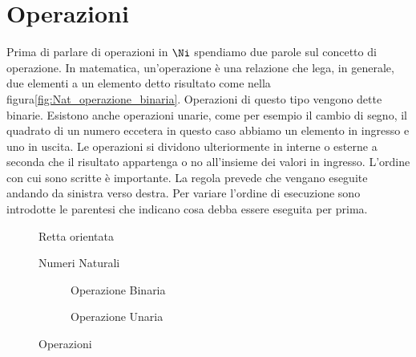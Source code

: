 \section{Operazioni}
Prima di parlare di operazioni in $\Ni$ spendiamo due parole sul concetto di operazione. In matematica, un'operazione è una relazione che lega, in generale, due elementi a un elemento detto risultato come nella figura\nobs\vref{fig:Nat_operazione_binaria}. Operazioni di questo tipo vengono dette binarie. Esistono anche operazioni unarie, come per esempio il cambio di segno, il quadrato di un numero eccetera in questo caso abbiamo un elemento in ingresso e uno in uscita. Le operazioni si dividono ulteriormente in interne o esterne a seconda che il risultato appartenga o no all'insieme dei valori in ingresso. L'ordine con cui sono scritte è importante. La regola prevede che vengano eseguite andando da sinistra verso destra. Per variare l'ordine di esecuzione sono introdotte le parentesi che indicano cosa debba essere eseguita per prima.
\begin{figure} 
	\centering

	\caption{Retta orientata}
	\label{fig:NumeriNaturaliRetta}\end{figure}
\begin{figure} 
	\centering

	\caption{Numeri Naturali}
	\label{fig:NumeriNaturali}\end{figure}
\begin{figure}
	\begin{subfigure}[b]{.5\linewidth}
		\centering

	\caption{Operazione Binaria}
	\label{fig:Nat_operazione_binaria}
	\end{subfigure}%
	\begin{subfigure}[b]{.5\linewidth}
	\centering

	\caption{Operazione Unaria}
	\label{fig:Nat_operazione_unaria}
	\end{subfigure}
		\caption{Operazioni}
	\label{fig:OPerzionicasogen}
\end{figure}
